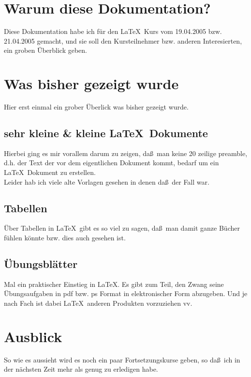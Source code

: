 \documentclass[12pt,twoside,a4paper]{article}
\begin{document}
	
	\section{Warum diese Dokumentation?}
	
	Diese Dokumentation habe ich f\"ur den \LaTeX \ Kurs vom 19.04.2005 
	bzw. 21.04.2005 
	gemacht, und sie soll den Kursteilnehmer bzw. anderen Interesierten,
	ein groben \"Uberblick geben. 
	
	\section{Was bisher gezeigt wurde}
	
	Hier erst einmal ein grober \"Uberlick was bisher gezeigt wurde. 
	
	\subsection{sehr kleine \& kleine \LaTeX \ Dokumente}
	
	Hierbei ging es mir vorallem darum zu zeigen, da\ss \ man keine
	20 zeilige preamble, d.h. der Text der vor dem eigentlichen 
	Dokument kommt, bedarf um ein \LaTeX \ Dokument zu erstellen. \\
	Leider hab ich viele alte Vorlagen gesehen in denen da\ss \ der Fall war.
	
	\subsection{Tabellen} 
	
	\"Uber Tabellen in \LaTeX \ gibt es so viel zu sagen, da\ss \ man damit ganze 
	B\"ucher f\"uhlen k\"onnte bzw. dies auch gesehen ist. 
	
	\subsection{\"Ubungsbl\"atter}
	Mal ein praktischer Einstieg in \LaTeX . Es gibt zum Teil, den Zwang seine 
	\"Ubungsaufgaben in pdf bzw. ps Format in elektronischer Form abzugeben.
	Und je nach Fach ist dabei \LaTeX \ anderen Produkten vorzuziehen vv.
	
	\section{Ausblick}
	
	So wie es aussieht wird es noch ein paar Fortsetzungskurse geben,
	so da\ss \ ich in der n\"achsten Zeit mehr als genug zu erledigen habe.  
	
	
	
	
\end{document}
